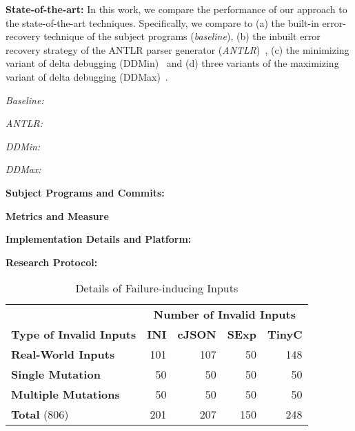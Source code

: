 \documentclass[sigconf,review,anonymous]{acmart}
\newcounter{todocounter}
\newcommand{\todo}[1]{\marginpar{$|$}\textcolor{red}{\stepcounter{todocounter}\footnote[\thetodocounter]{\textcolor{red}{\textbf{TODO }}\textit{#1}}}}
\renewcommand{\todo}[1]{}
\begin{document}
\noindent
\textbf{State-of-the-art:} 
In this work, we compare the performance of our approach to the state-of-the-art techniques. Specifically, we compare to (a) the built-in error-recovery technique of the subject programs (\textit{baseline}), (b) the inbuilt error recovery strategy of the ANTLR parser generator (\textit{ANTLR})~\cite{}, (c) the minimizing variant of delta debugging (DDMin)~\cite{} and (d) three variants of the maximizing variant of delta debugging (DDMax)~\cite{kirschner2020debugging}.

\todo{cite and create command shortcuts for the state-of-the-art}

\noindent \textit{Baseline:}

\noindent \textit{ANTLR:}

\noindent \textit{DDMin:}

\noindent \textit{DDMax:}




\noindent
\textbf{Subject Programs and Commits:}


\noindent
\textbf{Metrics and Measure}

\noindent
\textbf{Implementation Details and Platform:}

\noindent
\textbf{Research Protocol:} 


\begin{table}[!tbp]\centering
\caption{Details of Failure-inducing Inputs}
\begin{tabular}{|l | r | r | r | r |}
\hline
&  \multicolumn{4}{c|}{\textbf{Number of Invalid Inputs}}  \\
\textbf{Type of Invalid Inputs} & \textbf{INI} & \textbf{cJSON} & \textbf{SExp} & \textbf{TinyC} \\
\hline
\textbf{Real-World Inputs} & 101 & 107 & 50 & 148 \\
\textbf{Single Mutation} & 50 & 50 & 50 & 50 \\
\textbf{Multiple Mutations} & 50 & 50 & 50 & 50 \\
\hline
\textbf{Total } (806) & 201 & 207 & 150 & 248 \\
\hline
\end{tabular}
\label{tab:input-details}
\end{table}
\end{document}
